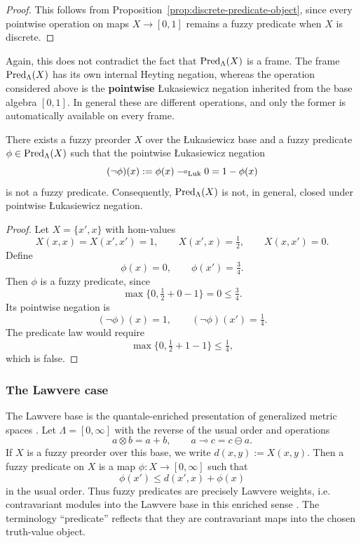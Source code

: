 \begin{proof}
    This follows from Proposition~\ref{prop:discrete-predicate-object}, since every pointwise operation on maps \(X\to[0,1]\) remains a fuzzy predicate when \(X\) is discrete.
\end{proof}

\begin{remark}
\label{rem:lukasiewicz-frame-vs-pointwise-negation}
    Again, this does not contradict the fact that \(\mathrm{Pred}_\Lambda(X)\) is a frame. The frame \(\mathrm{Pred}_\Lambda(X)\) has its own internal Heyting negation, whereas the operation considered above is the \textbf{pointwise} {\L}ukasiewicz negation inherited from the base algebra \([0,1]\). In general these are different operations, and only the former is automatically available on every frame.
\end{remark}

\begin{proposition}
\label{prop:lukasiewicz-pointwise-negation-not-closed}
    There exists a fuzzy preorder \(X\) over the {\L}ukasiewicz base and a fuzzy predicate \(\phi\in \mathrm{Pred}_\Lambda(X)\) such that the pointwise {\L}ukasiewicz negation
    \[
        (\neg \phi)(x):=\phi(x)\multimap_{\mathrm{Luk}} 0=1-\phi(x)
    \]
    is not a fuzzy predicate. Consequently, \(\mathrm{Pred}_\Lambda(X)\) is not, in general, closed under pointwise {\L}ukasiewicz negation.
\end{proposition}

\begin{proof}
    Let \(X=\{x',x\}\) with hom-values
    \[
        X(x,x)=X(x',x')=1,
        \qquad
        X(x',x)=\tfrac12,
        \qquad
        X(x,x')=0.
    \]
    Define
    \[
        \phi(x)=0,
        \qquad
        \phi(x')=\tfrac34.
    \]
    Then \(\phi\) is a fuzzy predicate, since
    \[
        \max\{0,\tfrac12+0-1\}=0\leq \tfrac34.
    \]
    Its pointwise negation is
    \[
        (\neg \phi)(x)=1,
        \qquad
        (\neg \phi)(x')=\tfrac14.
    \]
    The predicate law would require
    \[
        \max\{0,\tfrac12+1-1\}\leq \tfrac14,
    \]
    which is false.
\end{proof}

\subsubsection{The Lawvere case}

The Lawvere base is the quantale-enriched presentation of generalized metric spaces \cite{Lawvere1973MetricSpaces} \cite[Example~2.3]{stubbe-2014-quantaloid-enriched}. Let \(\Lambda=[0,\infty]\) with the reverse of the usual order and operations
\[
    a\otimes b=a+b,
    \qquad
    a\multimap c=c\ominus a.
\]
If \(X\) is a fuzzy preorder over this base, we write \(d(x,y):=X(x,y)\). Then a fuzzy predicate on \(X\) is a map \(\phi:X\to [0,\infty]\) such that
\[
    \phi(x')\leq d(x',x)+\phi(x)
\]
in the usual order. Thus fuzzy predicates are precisely Lawvere weights, i.e. contravariant modules into the Lawvere base in this enriched sense \cite{Lawvere1973MetricSpaces} \cite[Example~2.3]{stubbe-2014-quantaloid-enriched}. The terminology ``predicate'' reflects that they are contravariant maps into the chosen truth-value object.

